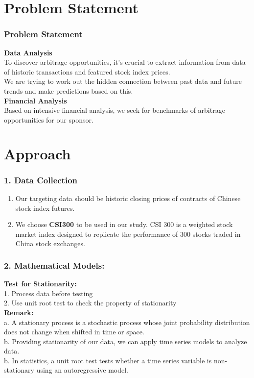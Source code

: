 \documentclass[compress,handout,10pt]{beamer}
\let\olditem\item
\renewcommand{\item}{\setlength{\itemsep}{0.5\baselineskip}\olditem}
\begin{document}
\section{Problem Statement}

\begin{frame}
    \frametitle{Problem Statement}
{\bf{Data Analysis}} \\To discover arbitrage opportunities, it's crucial to extract information from data of historic transactions and featured stock index prices. \\
We are trying to work out the hidden connection between past data and future trends and make predictions based on this.\\
\vspace{7pt}
{\bf{Financial Analysis}}\\ Based on intensive financial analysis, we seek for benchmarks of arbitrage opportunities for our sponsor.\\
\end{frame}

\section{Approach}
\begin{frame}
    \frametitle{1. Data Collection}
\begin{enumerate}
\item Our targeting data should be historic closing prices of contracts of Chinese stock index futures.
\item We choose {\bf{CSI300}} to be used in our study. CSI 300 is a weighted stock market index designed to replicate the performance of 300 stocks traded in China stock exchanges.
\end{enumerate}    
\end{frame}

\begin{frame}
    \frametitle{2. Mathematical Models:}
{\bf{Test for Stationarity:}}\\
\vspace{7pt}
1. Process data before testing\\
\vspace{5pt}
2. Use unit root test to check the property of stationarity\\
\vspace{10pt}
 {\bf{Remark:}} 
\\
\noindent a. A stationary process is a stochastic process whose joint probability distribution does not change when shifted in time or space.\\
b. Providing stationarity of our data, we can apply time series models to analyze data.\\
b. In statistics, a unit root test tests whether a time series variable is non-stationary using an autoregressive model.

\end{frame}
\end{document}

